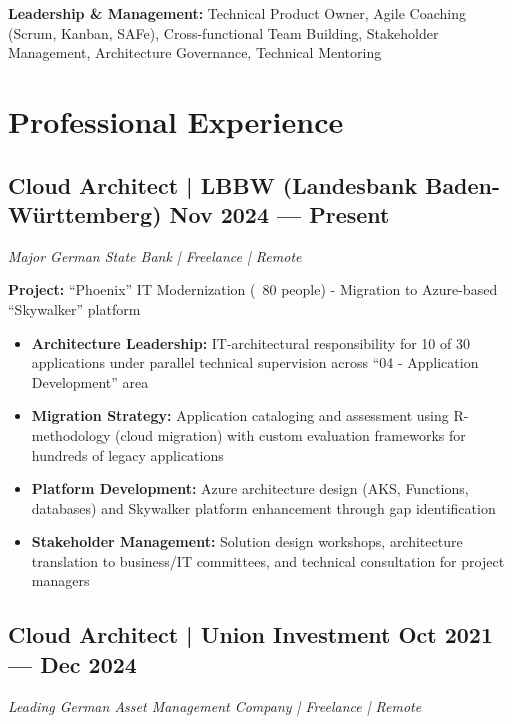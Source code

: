 \documentclass[10pt,a4paper]{article}
\begin{document}
\vspace{4pt}

\textbf{Leadership \& Management:} Technical Product Owner, Agile Coaching (Scrum, Kanban, SAFe), Cross-functional Team Building, Stakeholder Management, Architecture Governance, Technical Mentoring

\newpage

\section{Professional Experience}

\subsection{Cloud Architect | LBBW (Landesbank Baden-Württemberg) \hfill Nov 2024 --- Present}
\textit{Major German State Bank | Freelance | Remote}

\textbf{Project:} ``Phoenix'' IT Modernization (~80 people) - Migration to Azure-based ``Skywalker'' platform
\begin{itemize}
\item \textbf{Architecture Leadership:} IT-architectural responsibility for 10 of 30 applications under parallel technical supervision across ``04 - Application Development'' area
\item \textbf{Migration Strategy:} Application cataloging and assessment using R-methodology (cloud migration) with custom evaluation frameworks for hundreds of legacy applications
\item \textbf{Platform Development:} Azure architecture design (AKS, Functions, databases) and Skywalker platform enhancement through gap identification
\item \textbf{Stakeholder Management:} Solution design workshops, architecture translation to business/IT committees, and technical consultation for project managers
\end{itemize}

\vspace{4pt}

\subsection{Cloud Architect | Union Investment \hfill Oct 2021 --- Dec 2024}
\textit{Leading German Asset Management Company | Freelance | Remote}
\end{document}
